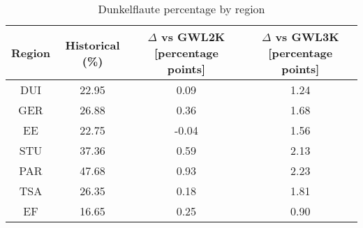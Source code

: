 \begin{table}[!htbp]
\centering
\caption{Dunkelflaute percentage by region}
\label{Table:Dunkelflaute_regions}
\begin{tabular}{cccc}
\hline
Region & Historical (\%) & $\Delta$ vs GWL2K [percentage points] & $\Delta$ vs GWL3K [percentage points] \\
\hline
DUI & 22.95 & 0.09 & 1.24\\

GER & 26.88 & 0.36 & 1.68\\

EE & 22.75 & -0.04 & 1.56\\

STU & 37.36 & 0.59 & 2.13\\

PAR & 47.68 & 0.93 & 2.23\\

TSA & 26.35 & 0.18 & 1.81\\

EF & 16.65 & 0.25 & 0.90\\

\bottomrule
\end{tabular}
\end{table}
